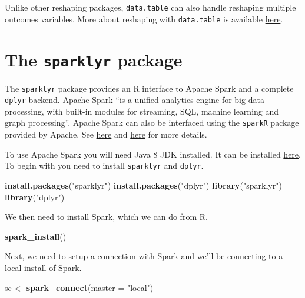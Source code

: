 \documentclass[]{book}
\newenvironment{Shaded}{\begin{snugshade}}{\end{snugshade}}
\newcommand{\DataTypeTok}[1]{\textcolor[rgb]{0.13,0.29,0.53}{#1}}
\newcommand{\KeywordTok}[1]{\textcolor[rgb]{0.13,0.29,0.53}{\textbf{#1}}}
\newcommand{\NormalTok}[1]{#1}
\newcommand{\StringTok}[1]{\textcolor[rgb]{0.31,0.60,0.02}{#1}}
\begin{document}
Unlike other reshaping packages, \texttt{data.table} can also handle reshaping multiple outcomes variables. More about reshaping with \texttt{data.table} is available \href{https://cran.r-project.org/web/packages/data.table/vignettes/datatable-reshape.html}{here}.

\hypertarget{the-sparklyr-package}{%
\section{\texorpdfstring{The \texttt{sparklyr} package}{The sparklyr package}}\label{the-sparklyr-package}}

The \texttt{sparklyr} package provides an R interface to Apache Spark and a complete \texttt{dplyr} backend. Apache Spark ``is a unified analytics engine for big data processing, with built-in modules for streaming, SQL, machine learning and graph processing''. Apache Spark can also be interfaced using the \texttt{sparkR} package provided by Apache. See \href{https://spark.apache.org/docs/2.4.0/}{here} and \href{https://spark.apache.org/docs/2.4.0/api/R/index.html}{here} for more details.

To use Apache Spark you will need Java 8 JDK installed. It can be installed \href{https://www.oracle.com/technetwork/java/jdk8-downloads-2133151.html}{here}. To begin with you need to install \texttt{sparklyr} and \texttt{dplyr}.

\begin{Shaded}
\begin{Highlighting}[]
\KeywordTok{install.packages}\NormalTok{(}\StringTok{"sparklyr"}\NormalTok{)}
\KeywordTok{install.packages}\NormalTok{(}\StringTok{"dplyr"}\NormalTok{)}
\KeywordTok{library}\NormalTok{(}\StringTok{"sparklyr"}\NormalTok{)}
\KeywordTok{library}\NormalTok{(}\StringTok{"dplyr"}\NormalTok{)}
\end{Highlighting}
\end{Shaded}

We then need to install Spark, which we can do from R.

\begin{Shaded}
\begin{Highlighting}[]
\KeywordTok{spark_install}\NormalTok{()}
\end{Highlighting}
\end{Shaded}

Next, we need to setup a connection with Spark and we'll be connecting to a local install of Spark.

\begin{Shaded}
\begin{Highlighting}[]
\NormalTok{sc <-}\StringTok{ }\KeywordTok{spark_connect}\NormalTok{(}\DataTypeTok{master =} \StringTok{"local"}\NormalTok{)}
\end{Highlighting}
\end{Shaded}
\end{document}
